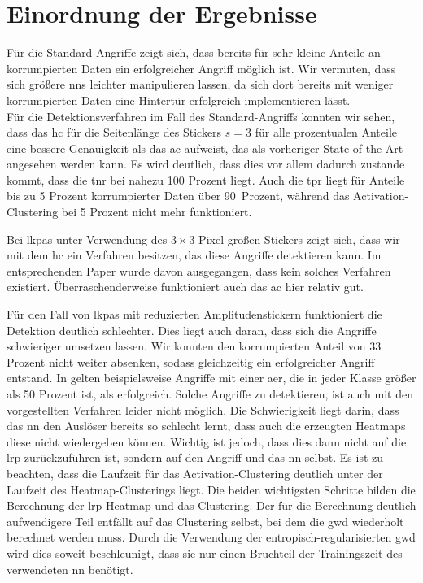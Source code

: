 \documentclass[twoside, 12pt,a4paper]{book}
\numberwithin{equation}{section}
\begin{document}
	\section{Einordnung der Ergebnisse}
	Für die Standard-Angriffe zeigt sich, dass bereits für sehr kleine Anteile an korrumpierten Daten ein erfolgreicher Angriff möglich ist.
	Wir vermuten, dass sich größere \acp{nn} leichter manipulieren lassen, da sich dort bereits mit weniger korrumpierten Daten eine Hintertür erfolgreich implementieren lässt. \\
	
	\noindent Für die Detektionsverfahren im Fall des Standard-Angriffs konnten wir sehen, dass das \ac{hc} für die Seitenlänge des Stickers $s=3$ für alle prozentualen Anteile eine bessere Genauigkeit als das \ac{ac} aufweist, das als vorheriger State-of-the-Art angesehen werden kann. Es wird deutlich, dass dies vor allem dadurch zustande kommt, dass die \ac{tnr} bei nahezu 100 Prozent liegt. Auch die \ac{tpr} liegt für Anteile bis zu 5 Prozent korrumpierter Daten über 90~Prozent, während das Activation-Clustering bei 5 Prozent nicht mehr funktioniert.
	
	\noindent Bei \acp{lkpa} unter Verwendung des $3\times 3$ Pixel großen Stickers zeigt sich, dass wir mit dem \ac{hc} ein Verfahren besitzen, das diese Angriffe detektieren kann. Im entsprechenden Paper \cite{labelconsistent} wurde davon ausgegangen, dass kein solches Verfahren existiert. Überraschenderweise funktioniert auch das \ac{ac} hier relativ gut.
	
	\noindent Für den Fall von \acp{lkpa} mit reduzierten Amplitudenstickern funktioniert die Detektion deutlich schlechter. Dies liegt auch daran, dass sich die Angriffe schwieriger umsetzen lassen. Wir konnten den korrumpierten Anteil von 33 Prozent nicht weiter absenken, sodass gleichzeitig ein erfolgreicher Angriff entstand. In \cite{labelconsistent} gelten beispielsweise Angriffe mit einer \ac{aer}, die in jeder Klasse größer als 50 Prozent ist, als erfolgreich. Solche Angriffe zu detektieren, ist auch mit den vorgestellten Verfahren leider nicht möglich. Die Schwierigkeit liegt darin, dass das \ac{nn} den Auslöser bereits so schlecht lernt, dass auch die erzeugten Heatmaps diese nicht wiedergeben können. Wichtig ist jedoch, dass dies dann nicht auf die \ac{lrp} zurückzuführen ist, sondern auf den Angriff und das \ac{nn} selbst. 	
	\noindent Es ist zu beachten, dass die Laufzeit für das Activation-Clustering deutlich unter der Laufzeit des Heatmap-Clusterings liegt. Die beiden wichtigsten Schritte bilden die Berechnung der \ac{lrp}-Heatmap und das Clustering. Der für die Berechnung deutlich aufwendigere Teil entfällt auf das Clustering selbst, bei dem die \ac{gwd} wiederholt berechnet werden muss. Durch die Verwendung der entropisch-regularisierten \ac{gwd} wird dies soweit beschleunigt, dass sie nur einen Bruchteil der Trainingszeit des verwendeten \ac{nn} benötigt.
	
\end{document}
